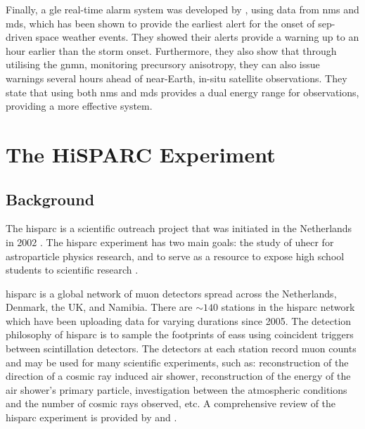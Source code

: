 Finally, a \gls{gle} real-time alarm system was developed by \citet{kuwabara_real-time_2006, kuwabara_development_2006}, using data from \glspl{nm} and \glspl{md}, which has been shown to provide the earliest alert for the onset of \gls{sep}-driven space weather events. They showed their alerts provide a warning up to an hour earlier than the storm onset. Furthermore, they also show that through utilising the \gls{gnmn}, monitoring precursory anisotropy, they can also issue warnings several hours ahead of near-Earth, in-situ satellite observations. They state that using both \glspl{nm} and \glspl{md} provides a dual energy range for observations, providing a more effective system.


\glsresetall 
{}
\section{The HiSPARC Experiment}\label{sec:intro_HiSPARC}

\subsection{Background}

The \gls{hisparc} is a scientific outreach project that was initiated in the Netherlands in 2002 \citep{bartels_hisparc_2012}. The \gls{hisparc} experiment has two main goals: the study of \gls{uhecr} for astroparticle physics research, and to serve as a resource to expose high school students to scientific research \citep{bartels_hisparc_2012}.

\gls{hisparc} is a global network of muon detectors spread across the Netherlands, Denmark, the UK, and Namibia. There are $\sim140$ stations in the \gls{hisparc} network \citep{van_dam_hisparc_2020} which have been uploading data for varying durations since 2005. The detection philosophy of \gls{hisparc} is to sample the footprints of \glspl{eas} using coincident triggers between scintillation detectors. The detectors at each station record muon counts and may be used for many scientific experiments, such as: reconstruction of the direction of a cosmic ray induced air shower, reconstruction of the energy of the air shower's primary particle, investigation between the atmospheric conditions and the number of cosmic rays observed, etc. A comprehensive review of the \gls{hisparc} experiment is provided by \citet{fokkema_hisparc_2012} and \citet{van_dam_hisparc_2020}.

